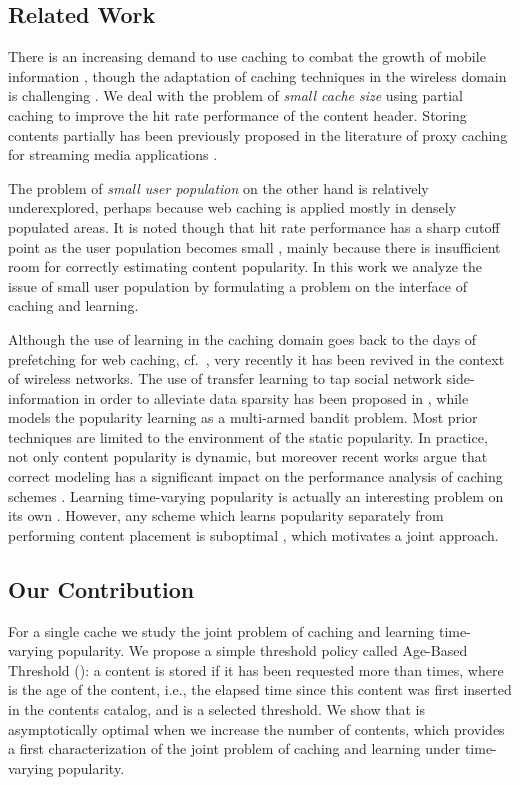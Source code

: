 \documentclass[10pt, conference, letterpaper]{IEEEtran}
\newcommand{\spyros}[1]{{#1}}
\begin{document}
\subsection{Related Work}

There is an increasing demand to use caching to combat the growth of mobile information \cite{IdealvsReality}, though the adaptation of caching techniques in the wireless domain is challenging \cite{5Gcaching}.
We deal with the problem of \emph{small cache size} using partial caching \cite{Ahle14} to improve the hit rate performance of the content header.
Storing contents partially has been previously proposed in the literature of proxy caching for streaming media applications \cite{Liu04,Sen99}.

The problem of \emph{small user population} on the other hand is relatively underexplored, perhaps because web caching is applied mostly in densely populated areas. It is noted though that hit rate performance has a sharp cutoff point as the user population becomes small \cite{Wolman}, mainly because there is insufficient room for correctly estimating content popularity. In this work we analyze the issue of small user population by formulating a problem on the interface of caching and learning.

Although the use of learning in the caching domain goes back to the days of prefetching for web caching, cf.~\cite{Pallis}, very recently it has been revived in the context of wireless networks. The use of transfer learning to tap social network side-information in order to alleviate data sparsity has been proposed in \cite{bastug2014b}, while \cite{Blasco} models the popularity learning as a multi-armed bandit problem. 
Most prior techniques are limited to the environment of the static popularity.
In practice, not only content popularity is dynamic, but moreover recent works argue that correct modeling has a significant impact on the performance analysis of caching schemes \cite{traverso2015,shen}. 
Learning time-varying popularity is actually an interesting problem on its own \cite{Szabo10,Ahmed13}.
However, any scheme which learns popularity separately from performing content placement is suboptimal \cite{moharir}, which  motivates a joint approach.


\subsection{Our Contribution}



For a single cache we study the joint problem of caching and learning time-varying popularity. We propose  a simple threshold policy called \spyros {Age-Based Threshold} (): a content is stored if it has been requested more than  times, where  is the age of the content\spyros {, i.e., the elapsed time since this content was first inserted in the contents catalog}, and  is a selected threshold. 
We show that  is asymptotically optimal when we increase the number of contents, which provides a first characterization of the joint problem of caching and learning under time-varying popularity.
\end{document}
